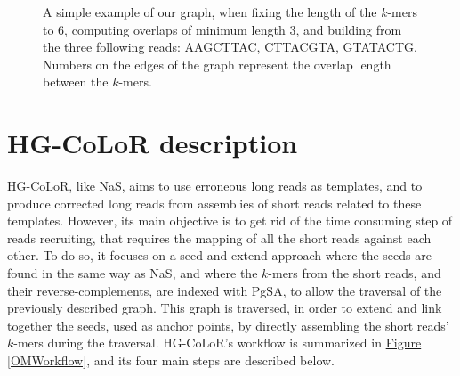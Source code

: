 \documentclass[long, final]{jobim2017}
\begin{document}
\begin{figure}
	\begin{center}
	\end{center}
	\caption{A simple example of our graph, when fixing the length of the $k$-mers to 6, computing overlaps of minimum length 3, and building
	from the three following reads: AAGCTTAC, CTTACGTA, GTATACTG. Numbers on the edges of the graph represent the overlap length 
	between the $k$-mers.
	\label{HGraph}}
\end{figure}

\section{HG-CoLoR description}
\label{sec:OMO}

HG-CoLoR, like NaS, aims to use erroneous long reads as templates, and to produce corrected long reads from assemblies of short reads related to these templates. However, its main objective is to get rid of the time consuming step of reads recruiting, that requires the mapping of all the short reads against each other. To do so, it focuses on a seed-and-extend approach where the seeds are found in the same way as NaS, and where the $k$-mers from the short reads, and their reverse-complements, are indexed with PgSA, to allow the traversal of the previously described graph. This graph is traversed, in order to extend and link together the seeds, used as anchor points, by directly assembling the short reads' $k$-mers during the traversal. HG-CoLoR's workflow is summarized in \hyperref[OMWorkflow]{Figure \ref*{OMWorkflow}}, and its four main steps are described below.
\end{document}
